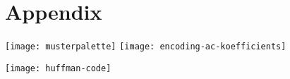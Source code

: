 \section{Appendix}\label{sec:appendix}


%

\begin{center}
    \texttt{[image: musterpalette]}
    \texttt{[image: encoding-ac-koefficients]}
\end{center}

\texttt{[image: huffman-code]}